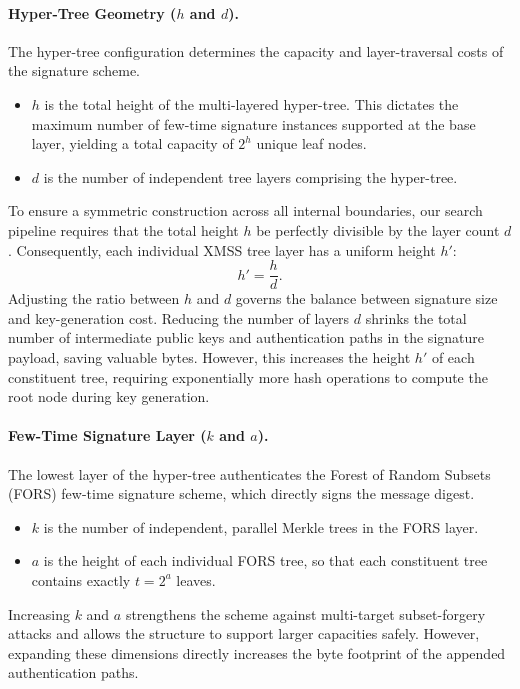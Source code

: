 \paragraph{Hyper-Tree Geometry ($h$ and $d$).}
The hyper-tree configuration determines the capacity and layer-traversal costs of the signature scheme.
\begin{itemize}
    \item $h$ is the total height of the multi-layered hyper-tree. This dictates the maximum number of few-time signature instances supported at the base layer, yielding a total capacity of $2^h$ unique leaf nodes.
    \item $d$ is the number of independent tree layers comprising the hyper-tree.
\end{itemize}
To ensure a symmetric construction across all internal boundaries, our search pipeline requires that the total height $h$ be perfectly divisible by the layer count $d$. Consequently, each individual XMSS tree layer has a uniform height $h'$:
\begin{equation*}
    h' = \frac{h}{d}.
\end{equation*}
Adjusting the ratio between $h$ and $d$ governs the balance between signature size and key-generation cost. Reducing the number of layers $d$ shrinks the total number of intermediate public keys and authentication paths in the signature payload, saving valuable bytes. However, this increases the height $h'$ of each constituent tree, requiring exponentially more hash operations to compute the root node during key generation.

\paragraph{Few-Time Signature Layer ($k$ and $a$).}
The lowest layer of the hyper-tree authenticates the Forest of Random Subsets (FORS) few-time signature scheme, which directly signs the message digest.
\begin{itemize}
    \item $k$ is the number of independent, parallel Merkle trees in the FORS layer.
    \item $a$ is the height of each individual FORS tree, so that each constituent tree contains exactly $t = 2^a$ leaves.
\end{itemize}

Increasing $k$ and $a$ strengthens the scheme against multi-target subset-forgery attacks and allows the structure to support larger capacities safely. However, expanding these dimensions directly increases the byte footprint of the appended authentication paths.

